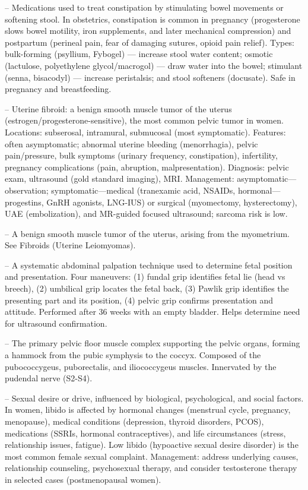 -- Medications used to treat constipation by stimulating bowel movements or softening stool. In obstetrics, constipation is common in pregnancy (progesterone slows bowel motility, iron supplements, and later mechanical compression) and postpartum (perineal pain, fear of damaging sutures, opioid pain relief). Types: bulk-forming (psyllium, Fybogel) — increase stool water content; osmotic (lactulose, polyethylene glycol/macrogol) — draw water into the bowel; stimulant (senna, bisacodyl) — increase peristalsis; and stool softeners (docusate). Safe in pregnancy and breastfeeding.

-- Uterine fibroid: a benign smooth muscle tumor of the uterus (estrogen/progesterone-sensitive), the most common pelvic tumor in women. Locations: subserosal, intramural, submucosal (most symptomatic). Features: often asymptomatic; abnormal uterine bleeding (menorrhagia), pelvic pain/pressure, bulk symptoms (urinary frequency, constipation), infertility, pregnancy complications (pain, abruption, malpresentation). Diagnosis: pelvic exam, ultrasound (gold standard imaging), MRI. Management: asymptomatic—observation; symptomatic—medical (tranexamic acid, NSAIDs, hormonal—progestins, GnRH agonists, LNG-IUS) or surgical (myomectomy, hysterectomy), UAE (embolization), and MR-guided focused ultrasound; sarcoma risk is low.

-- A benign smooth muscle tumor of the uterus, arising from the myometrium. See Fibroids (Uterine Leiomyomas).

-- A systematic abdominal palpation technique used to determine fetal position and presentation. Four maneuvers: (1) fundal grip identifies fetal lie (head vs breech), (2) umbilical grip locates the fetal back, (3) Pawlik grip identifies the presenting part and its position, (4) pelvic grip confirms presentation and attitude. Performed after 36 weeks with an empty bladder. Helps determine need for ultrasound confirmation.

-- The primary pelvic floor muscle complex supporting the pelvic organs, forming a hammock from the pubic symphysis to the coccyx. Composed of the pubococcygeus, puborectalis, and iliococcygeus muscles. Innervated by the pudendal nerve (S2-S4).

-- Sexual desire or drive, influenced by biological, psychological, and social factors. In women, libido is affected by hormonal changes (menstrual cycle, pregnancy, menopause), medical conditions (depression, thyroid disorders, PCOS), medications (SSRIs, hormonal contraceptives), and life circumstances (stress, relationship issues, fatigue). Low libido (hypoactive sexual desire disorder) is the most common female sexual complaint. Management: address underlying causes, relationship counseling, psychosexual therapy, and consider testosterone therapy in selected cases (postmenopausal women).

